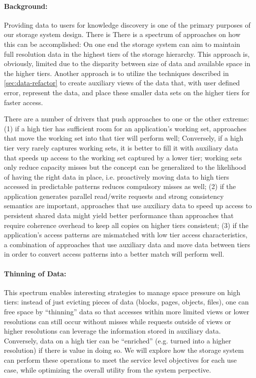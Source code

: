 \paragraph{Background:} Providing data to users for knowledge discovery is
one of the primary purposes of our storage system design. There is
There is a
spectrum of approaches on how
this can be accomplished: On one end the storage system can aim to maintain
full resolution data in the highest tiers of the storage hierarchy. This
approach is, obviously, limited due to the disparity between size of data
and available space in the higher tiers. Another approach is to utilize the
techniques described in \ref{sec:data-refactor} to create auxiliary views of
the data that, with user defined error, represent the data, and place these
smaller data sets on the higher tiers for faster access. 

There are a
number of drivers that push approaches to one or the other extreme:
(1) if a high tier has sufficient room for an application's working
set, approaches that move the working set into that tier will perform
well; Conversely, if a high tier very rarely captures working sets,
it is better to fill it with auxiliary data that speeds up access
to the working set captured by a lower tier; working sets only
reduce capacity misses but the concept can be generalized to the
likelihood of having the right data in place, i.e. proactively
moving data to high tiers accessed in predictable patterns reduces
compulsory misses as well; (2) if the application generates parallel
read/write requests and strong consistency semantics are important,
approaches that use auxiliary data to speed up access to persistent
shared data might yield better performance than approaches that
require coherence overhead to keep all copies on higher tiers
consistent; (3) if the application's access patterns are mismatched
with low tier access characteristics, a combination of approaches
that use auxiliary data and move data between tiers in order to
convert access patterns into a better match will perform well.

\paragraph{Thinning of Data:} 
This spectrum enables interesting strategies
to manage space pressure on high tiers: instead of just evicting
pieces of data (blocks, pages, objects, files), one can free space
by ``thinning'' data so that accesses within more limited views or
lower resolutions can still occur without misses while requests
outside of views or higher resolutions can leverage the information
stored in auxiliary data. Conversely, data on a high tier can be
``enriched'' (e.g. turned into a higher resolution) if there is
value in doing so. We will explore how the storage system can perform these
operations to meet the service level objectives for each use case, while
optimizing the overall utility from the system perpective. 

